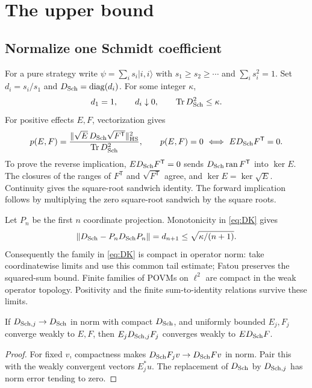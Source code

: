 \section{The upper bound}\label{sec:upper}
\subsection{Normalize one Schmidt coefficient}
For a pure strategy write $\psi=\sum_i s_i|i,i\rangle$ with $s_1\geq s_2\geq\cdots$ and $\sum_i s_i^2=1$. Set $d_i=s_i/s_1$ and $D_{\rm Sch}=\operatorname{diag}(d_i)$. For some integer $\kappa$,
\begin{equation}\label{eq:DK}
 d_1=1,\qquad d_i\downarrow0,\qquad \operatorname{Tr} D_{\rm Sch}^2\leq \kappa.
\end{equation}
For positive effects $E,F$, vectorization gives
\[
 p(E,F)=\frac{\|\sqrt E\,D_{\rm Sch}\sqrt{F^{\mathsf T}}\|_{\rm HS}^2}{\operatorname{Tr} D_{\rm Sch}^2},
 \qquad p(E,F)=0\ \Longleftrightarrow\ ED_{\rm Sch}F^{\mathsf T}=0.
\]
To prove the reverse implication, $ED_{\rm Sch}F^{\mathsf T}=0$ sends $D_{\rm Sch}\operatorname{ran} F^{\mathsf T}$ into $\ker E$. The closures of the ranges of $F^{\mathsf T}$ and $\sqrt{F^{\mathsf T}}$ agree, and $\ker E=\ker\sqrt E$. Continuity gives the square-root sandwich identity. The forward implication follows by multiplying the zero square-root sandwich by the square roots.

Let $P_n$ be the first $n$ coordinate projection. Monotonicity in \eqref{eq:DK} gives
\begin{equation}\label{eq:tail}
 \|D_{\rm Sch}-P_nD_{\rm Sch}P_n\|=d_{n+1}\leq\sqrt{\kappa/(n+1)}.
\end{equation}
Consequently the family in \eqref{eq:DK} is compact in operator norm: take coordinatewise limits and use this common tail estimate; Fatou preserves the squared-sum bound. Finite families of POVMs on $\ell^2$ are compact in the weak operator topology. Positivity and the finite sum-to-identity relations survive these limits.

\begin{lemma}\label{lem:sandwich}
If $D_{{\rm Sch},j}\to D_{\rm Sch}$ in norm with compact $D_{\rm Sch}$, and uniformly bounded $E_j,F_j$ converge weakly to $E,F$, then $E_jD_{{\rm Sch},j}F_j$ converges weakly to $ED_{\rm Sch}F$.
\end{lemma}
\begin{proof}
For fixed $v$, compactness makes $D_{\rm Sch}F_jv\to D_{\rm Sch}Fv$ in norm. Pair this with the weakly convergent vectors $E_j^*u$. The replacement of $D_{\rm Sch}$ by $D_{{\rm Sch},j}$ has norm error tending to zero.
\end{proof}

